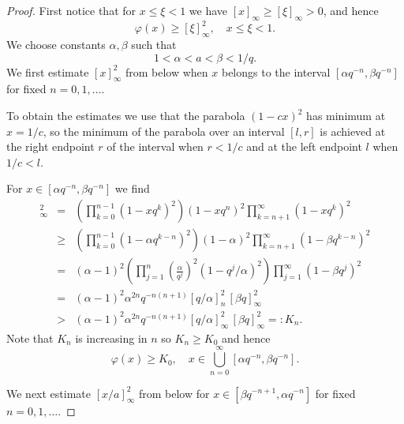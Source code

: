 \documentclass[10pt,a4paper]{amsart}
\begin{document}
\begin{proof} First notice that for $x\le \xi<1$ we have $[x]_\infty \ge [\xi]_\infty>0$, and hence
\begin{equation}\label{eq:1}
\varphi(x)\ge [\xi]_\infty^2,\quad x\le \xi<1.
\end{equation}
 We choose constants $\alpha,\beta$ such that
\begin{equation}
1<\alpha<a<\beta<1/q.
\end{equation} 
We first estimate $[x]_\infty^2$ from below when $x$ belongs to the interval $[\alpha q^{-n},\beta q^{-n}]$ for fixed $n=0,1,\ldots.$

To obtain the estimates we use that the parabola $(1-cx)^2$ has minimum at $x=1/c$, so the minimum of the parabola over an interval $[l,r]$ is achieved at the right endpoint $r$ of the interval when $r<1/c$ and at the left endpoint $l$ when $1/c<l$.
 
For $x\in[\alpha q^{-n}, \beta q^{-n}]$ we find
\begin{eqnarray*}
[x]_\infty^2&=&\left(\prod_{k=0}^{n-1}(1-xq^k)^2\right) (1-xq^n)^2\prod_{k=n+1}^\infty (1-xq^k)
^2\\
&\ge& \left(\prod_{k=0}^{n-1}(1-\alpha q^{k-n})^2\right)(1-\alpha)^2\prod_{k=n+1}^\infty(1-\beta q^{k-n})^2\\
&=& (\alpha-1)^2\left(\prod_{j=1}^n\left(\frac{\alpha}{q^j}\right)^2(1-q^j/\alpha)^2\right)\prod_{j=1}^\infty(1-\beta q^j)^2\\
&=& (\alpha-1)^2\alpha^{2n}q^{-n(n+1)}[q/\alpha]_n^2\,[\beta q]_\infty^2\\
&>&(\alpha-1)^2\alpha^{2n}q^{-n(n+1)}[q/\alpha]_\infty^2\,[\beta q]_\infty^2=:K_n.
\end{eqnarray*}
Note that $K_n$ is increasing in $n$ so $K_n\ge K_0$ and hence
\begin{equation}\label{eq:2}
\varphi(x)\ge K_0,\quad x\in\bigcup_{n=0}^\infty [\alpha q^{-n},\beta q^{-n}].
\end{equation} 

We next estimate $[x/a]_\infty^2$ from below for $x\in [\beta q^{-n+1},\alpha q^{-n}]$
for fixed $n=0,1,\ldots.$


\end{proof}
\end{document}

